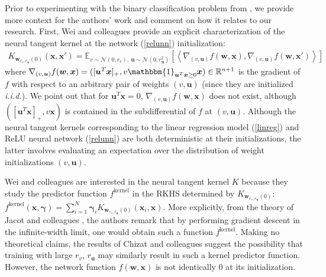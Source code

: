 \documentclass{article}
\begin{document}
Prior to experimenting with the binary classification problem from \cite{wei2019regularization}, we provide more context for the authors' work and comment on how it relates to our research. First, Wei and colleagues provide an explicit characterization of the neural tangent kernel at the network (\ref{relunn}) initialization:
\begin{align*}
    K_{\boldsymbol{w}_{r_v, r_{\boldsymbol{u}}}(0)}(\boldsymbol{x}, \boldsymbol{x}') = \mathbb{E}_{v \sim \mathcal{N}(0, r_v), \ \boldsymbol{u} \sim \mathcal{N}(0, r_{\boldsymbol{u}}^2)}[ \left\langle \nabla_{(v, \boldsymbol{u})}f(\boldsymbol{w}, \boldsymbol{x}), \nabla_{(v, \boldsymbol{u})}f(\boldsymbol{w}, \boldsymbol{x}') \right\rangle]
\end{align*}
where $\nabla_{(v, \boldsymbol{u})}f(\boldsymbol{w}, \boldsymbol{x}) = ([\boldsymbol{u}^T\boldsymbol{x}]_+, v\mathbbm{1}_{\boldsymbol{u}^T\boldsymbol{x} \geq 0}\boldsymbol{x}) \in \mathbb{R}^{n + 1}$ is the gradient of $f$ with respect to an arbitrary pair of weights $(v, \boldsymbol{u})$ (since they are initialized \textit{i.i.d.}). We point out that for $\boldsymbol{u}^T\boldsymbol{x}=0$, $\nabla_{(v, \boldsymbol{u})}f(\boldsymbol{w}, \boldsymbol{x})$ does not exist, although $([\boldsymbol{u}^T\boldsymbol{x}]_+, v\boldsymbol{x})$ is contained in the subdifferential of $f$ at $(v, \boldsymbol{u})$. Although the neural tangent kernels corresponding to the linear regression model (\ref{linreg}) and ReLU neural network (\ref{relunn}) are both deterministic at their initializations, the latter involves evaluating an expectation over the distribution of weight initializations $(v, \boldsymbol{u})$.

Wei and colleagues are interested in the neural tangent kernel $K$ because they study the predictor function $f^{\text{kernel}}$ in the RKHS determined by $K_{\boldsymbol{w}_{r_v, r_{\boldsymbol{u}}}(0)}$: $f^{\text{kernel}}(\boldsymbol{x}, \boldsymbol{\gamma}) = \sum_{i=1}^N \boldsymbol{\gamma}_i K_{\boldsymbol{w}_{r_v, r_{\boldsymbol{u}}}(0)}(\boldsymbol{x}_i, \boldsymbol{x})$. More explicitly, from the theory of Jacot and colleagues \cite{jacot2018neural}, the authors remark that by performing gradient descent in the infinite-width limit, one would obtain such a function $f^{\text{kernel}}$. Making no theoretical claims, the results of Chizat and colleagues \cite{chizat2018lazy} suggest the possibility that training with large $r_v$, $r_{\boldsymbol{u}}$ may similarly result in such a kernel predictor function. However, the network function $f(\boldsymbol{w}, \boldsymbol{x})$ is not identically $0$ at its initialization. 
\end{document}
